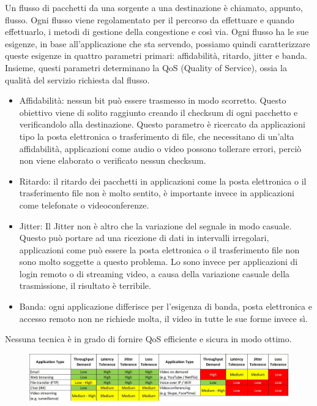 Un flusso di pacchetti da una sorgente a una destinazione è chiamato, appunto, flusso.
Ogni flusso viene regolamentato per il percorso da effettuare e quando effettuarlo, i metodi di gestione della congestione e così via.
Ogni flusso ha le sue esigenze, in base all’applicazione che sta servendo, possiamo quindi caratterizzare queste esigenze in quattro parametri primari: affidabilità, ritardo, jitter e banda. Insieme, questi parametri determinano la QoS (Quality of Service), ossia la qualità del servizio richiesta dal flusso.
\begin{itemize}
\item	Affidabilità: nessun bit può essere trasmesso in modo scorretto. Questo obiettivo viene di solito raggiunto creando il checksum di ogni pacchetto e verificandolo alla destinazione. Questo parametro è ricercato da applicazioni tipo la posta elettronica o trasferimento di file, che necessitano di un’alta affidabilità, applicazioni come audio o video possono tollerare errori, perciò non viene elaborato o verificato nessun checksum.
\item	Ritardo: il ritardo dei pacchetti in applicazioni come la posta elettronica o il trasferimento file non è molto sentito, è importante invece in applicazioni come telefonate o videoconferenze.
\item	Jitter: Il Jitter non è altro che la variazione del segnale in modo casuale. Questo può portare ad una ricezione di dati in intervalli irregolari, applicazioni come può essere la posta elettronica o il trasferimento file non sono molto soggette a questo problema. Lo sono invece per applicazioni di login remoto o di streaming video, a causa della variazione casuale della trasmissione, il risultato è terribile.
\item	Banda: ogni applicazione differisce per l’esigenza di banda, posta elettronica e accesso remoto non ne richiede molta, il video in tutte le sue forme invece sì.
\end{itemize}
Nessuna tecnica è in grado di fornire QoS efficiente e sicura in modo ottimo. 

\begin{figure}[H]
\centering
\includegraphics[scale=0.3]{res/img/40_QoS.png}
\end{figure}

